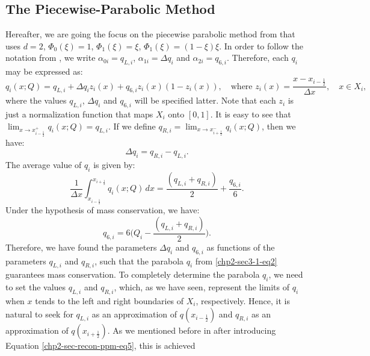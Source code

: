 \subsection{The Piecewise-Parabolic Method}
\label{chp2-sec-ppm}
Hereafter, we are going the focus on the piecewise parabolic method from \citet{colella:1984} that uses $d=2$, 
$\Phi_0(\xi)=1$, $\Phi_1(\xi)=\xi$, $\Phi_1(\xi)=(1-\xi)\xi$. 
In order to follow the notation from \citet{colella:1984},
we write $\alpha_{0i} = q_{L, i}$, $\alpha_{1i} = \Delta q_i$ and $\alpha_{2i} = q_{6, i}$.
Therefore, each $q_i$ may be expressed as:
\begin{equation}
	\label{chp2-sec-recon-ppm-eq1}
	q_i(x;Q) = q_{L, i} + \Delta q_i z_i(x) + q_{6, i}z_i(x)(1-z_i(x)), 
	\quad \text{where }
	z_i(x) = \frac{x-x_{i-\frac{1}{2}}}{\Delta x},
	\quad x \in X_i,
\end{equation}
where the values $q_{L, i}$, $\Delta q_i$ and $q_{6, i}$  will be specified latter.
Note that each $z_i$ is just a normalization function that maps $X_i$ onto $[0,1]$.
It is easy to see that 
$\lim_{x \to x_{i-\frac{1}{2}}^+} {q_i(x;Q)} = q_{L, i}$.
If we define $q_{R, i} = \lim_{x \to x_{i+\frac{1}{2}}^-} {q_i(x;Q)}$,
then we have:
\begin{equation}
	\label{chp2-sec-recon-ppm-eq2}
	\Delta q_i = q_{R, i} - q_{L, i}.
\end{equation}
The average value of $q_i$ is given by:
\begin{equation}
	\label{chp2-sec-recon-ppm-eq3}
	\frac{1}{\Delta x}\int_{x_{i-\frac{1}{2}}}^{x_{i+\frac{1}{2}}} {q}_i(x;Q) \,dx
	= \frac{(q_{L,i} + q_{R,i})}{2} + \frac{q_{6,i}}{6}.
\end{equation}
Under the hypothesis of mass conservation, we have:
\begin{equation}
	\label{chp2-sec-recon-ppm-eq4}
	q_{6,i} = 6\bigg(Q_i - \frac{(q_{L,i} + q_{R,i})}{2}\bigg).
\end{equation}
Therefore, we have found the parameters $\Delta q_i$ and $q_{6, i}$ as
functions of the parameters $q_{L, i}$ and $q_{R, i}$,
such that the parabola $q_i$ from \eqref{chp2-sec3-1-eq2} 
guarantees mass conservation. To completely determine the 
parabola $q_i$, we need to set the values $q_{L, i}$ and
$q_{R, i}$, which, as we have seen, represent the limits of $q_i$ when
$x$ tends to the left and right boundaries of $X_i$, respectively.
Hence, it is natural to seek for $q_{L, i}$ as an approximation of $q(x_{i-\frac{1}{2}})$
and $q_{R, i}$ as an approximation of $q(x_{i+\frac{1}{2}})$.
As we mentioned before in after introducing Equation \eqref{chp2-sec-recon-ppm-eq5}, this is achieved
